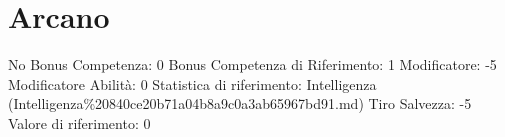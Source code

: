 \section{Arcano}\label{arcano}

\begin{description}
\tightlist
\item[Tags: ABI]
No Bonus Competenza: 0 Bonus Competenza di Riferimento: 1 Modificatore:
-5 Modificatore Abilità: 0 Statistica di riferimento: Intelligenza
(Intelligenza\%20840ce20b71a04b8a9c0a3ab65967bd91.md) Tiro Salvezza: -5
Valore di riferimento: 0
\end{description}
